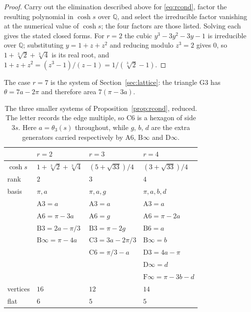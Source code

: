 \documentclass[11pt,a4paper]{article}
\theoremstyle{plain}
\theoremstyle{definition}
\theoremstyle{remark}
\newcommand{\QQ}{\mathbb{Q}}
\begin{document}
\begin{proof}
Carry out the elimination described above for \eqref{eq:rcond}, factor the
resulting polynomial in $\cosh s$ over $\QQ$, and select the irreducible factor
vanishing at the numerical value of $\cosh s$; the four factors are those listed.
Solving each gives the stated closed forms. For $r=2$ the cubic
$y^{3}-3y^{2}-3y-1$ is irreducible over $\QQ$; substituting $y=1+z+z^{2}$ and
reducing modulo $z^{3}=2$ gives $0$, so $1+\sqrt[3]{2}+\sqrt[3]{4}$ is its real
root, and $1+z+z^{2}=(z^{3}-1)/(z-1)=1/(\sqrt[3]{2}-1)$.
\end{proof}

The case $r=7$ is the system of Section~\ref{sec:lattice}: the triangle
$\mathrm{G}3$ has $\theta=7a-2\pi$ and therefore area $7(\pi-3a)$.

\begin{table}[t]
\centering
\begin{tabular}{@{}llll@{}}
\toprule
 & $r=2$ & $r=3$ & $r=4$ \\
\midrule
$\cosh s$ & $1+\sqrt[3]{2}+\sqrt[3]{4}$ & $(5+\sqrt{33})/4$ & $(3+\sqrt{33})/4$\\
rank      & $2$ & $3$ & $4$\\
basis     & $\pi,a$ & $\pi,a,g$ & $\pi,a,b,d$\\
\midrule
          & $\mathrm{A}3=a$          & $\mathrm{A}3=a$            & $\mathrm{A}3=a$\\
          & $\mathrm{A}6=\pi-3a$     & $\mathrm{A}6=g$            & $\mathrm{A}6=\pi-2a$\\
          & $\mathrm{B}3=2a-\pi/3$   & $\mathrm{B}3=\pi-2g$       & $\mathrm{B}6=a$\\
          & $\mathrm{B}\infty=\pi-4a$& $\mathrm{C}3=3a-2\pi/3$    & $\mathrm{B}\infty=b$\\
          &                          & $\mathrm{C}6=\pi/3-a$      & $\mathrm{D}3=4a-\pi$\\
          &                          &                            & $\mathrm{D}\infty=d$\\
          &                          &                            & $\mathrm{F}\infty=\pi-3b-d$\\
\midrule
vertices  & $16$ & $12$ & $14$\\
flat      & $6$  & $5$  & $5$\\
\bottomrule
\end{tabular}
\caption{The three smaller systems of Proposition~\ref{prop:rcond}, reduced. The
letter records the edge multiple, so $\mathrm{C}6$ is a hexagon of side $3s$.
Here $a=\theta_3(s)$ throughout, while $g$, $b$, $d$ are the extra generators
carried respectively by $\mathrm{A}6$, $\mathrm{B}\infty$ and $\mathrm{D}\infty$.}
\label{tab:rsys}
\end{table}
\end{document}
